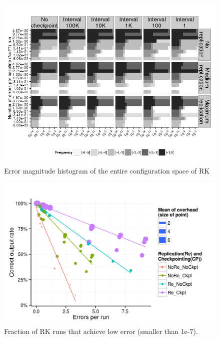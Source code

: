 \documentclass{sig-alternate}
\begin{document}
\begin{figure}[ht!]
\centering
\includegraphics[width=1.00\columnwidth]{figs/4_1_1_Exp2_2_Heatmap_Error_ConfSpace_RK4.png}
\caption{Error magnitude histogram of the entire configuration space of RK}
\label{fig:rt_algo_err_heatmap}
\end{figure}

\begin{figure}[ht!]
\centering
\includegraphics[width=1.00\columnwidth]{figs/4_1_2_Exp2_Effectiveness.png}
\caption{Fraction of RK runs that achieve low error (smaller than 1e-7).}
\label{fig:rk_effectiveness}
\end{figure}
\end{document}
